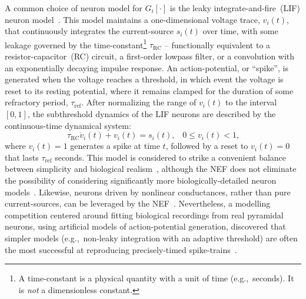 A common choice of neuron model for $G_i\left[ \cdot \right]$ is the leaky integrate-and-fire~(LIF) neuron model~\citep{koch1998methods}.
This model maintains a one-dimensional voltage trace, $v_i(t)$, that continuously integrates the current-source $s_i(t)$ over time, with some leakage governed by the time-constant\footnote{A time-constant is a physical quantity with a unit of time (e.g.,~seconds). It is \emph{not} a dimensionless constant.} $\tau_\text{RC}$ -- functionally equivalent to a resistor-capacitor~(RC) circuit, a first-order lowpass filter, or a convolution with an exponentially decaying impulse response.
An action-potential, or ``spike'', is generated when the voltage reaches a threshold, in which event the voltage is reset to its resting potential, where it remains clamped for the duration of some refractory period, $\tau_\text{ref}$.
After normalizing the range of $v_i(t)$ to the interval $[0, 1]$, the subthreshold dynamics of the LIF neurons are described by the continuous-time dynamical system:
\begin{equation} \label{eq:lif-model}
\tau_\text{RC} \dot{v}_i(t) + v_i(t) = s_i(t) \text{,} \quad 0 \le v_i(t) < 1 \text{,}
\end{equation}
where $v_i(t) = 1$ generates a spike at time $t$, followed by a reset to $v_i(t) = 0$ that lasts $\tau_\text{ref}$ seconds.
This model is considered to strike a convenient balance between simplicity and biological realism~\citep[][pp.~81--82]{eliasmith2003a}, although the NEF does not eliminate the possibility of considering significantly more biologically-detailed neuron models~\citep{duggins2017incorporating}.
Likewise, neurons driven by nonlinear conductances, rather than pure current-sources, can be leveraged by the NEF~\citep{stoeckel2018}.
Nevertheless, a modelling competition centered around fitting biological recordings from real pyramidal neurons, using artificial models of action-potential generation, discovered that simpler models (e.g.,~non-leaky integration with an adaptive threshold) are often the most successful at reproducing precisely-timed spike-trains~\citep{gerstner2009good}.

